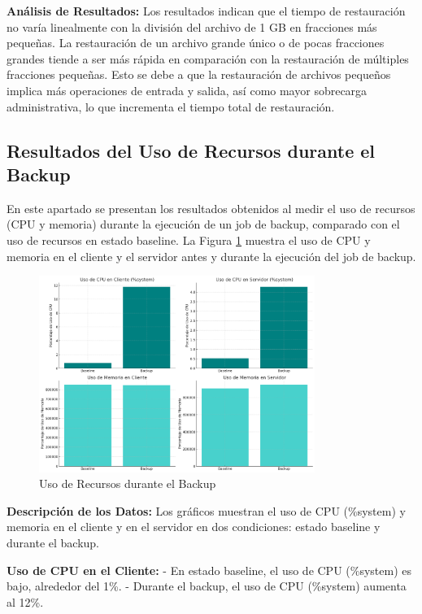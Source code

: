 \textbf{Análisis de Resultados:}
Los resultados indican que el tiempo de restauración no varía linealmente con la división del archivo de 1 GB en fracciones más pequeñas. La restauración de un archivo grande único o de pocas fracciones grandes tiende a ser más rápida en comparación con la restauración de múltiples fracciones pequeñas. Esto se debe a que la restauración de archivos pequeños implica más operaciones de entrada y salida, así como mayor sobrecarga administrativa, lo que incrementa el tiempo total de restauración.





  \subsection{Resultados del Uso de Recursos durante el Backup}

En este apartado se presentan los resultados obtenidos al medir el uso de recursos (CPU y memoria) durante la ejecución de un job de backup, comparado con el uso de recursos en estado baseline. La Figura \ref{fig:uso-recursos} muestra el uso de CPU y memoria en el cliente y el servidor antes y durante la ejecución del job de backup.

\begin{figure}[H]
    \centering
    \includegraphics[width=0.8\textwidth]{uso_de_recursos.png}
    \caption{Uso de Recursos durante el Backup}
    \label{fig:uso-recursos}
\end{figure}

\textbf{Descripción de los Datos:}
Los gráficos muestran el uso de CPU (\%system) y memoria en el cliente y en el servidor en dos condiciones: estado baseline y durante el backup.

\textbf{Uso de CPU en el Cliente:}
- En estado baseline, el uso de CPU (\%system) es bajo, alrededor del 1\%.
- Durante el backup, el uso de CPU (\%system) aumenta al 12\%.

